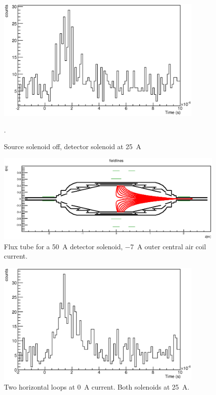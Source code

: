 \begin{figure}
\centering
	\includegraphics[width = 0.9\textwidth]{graphics/analysis/monSpec/AA.eps}
	\caption[\SI{25}{\ampere} asymmetric]{Source solenoid off, detector solenoid at \SI{25}{\ampere}}.
	\label{fig:AA}
\end{figure}
\clearpage



\begin{figure}
\centering
	\centerline{\includegraphics[width = 1.3\linewidth]{graphics/analysis/monSpec/fieldSimulation/AC.eps} }
	
	\caption[\SI{50}{\ampere} loops]{Flux tube for a \SI{50}{\ampere} detector solenoid, \SI{-7}{\ampere} outer central air coil current.}
	\label{fig:ACf}
\end{figure}

\begin{figure}
\centering
	\includegraphics[width = 0.9\textwidth]{graphics/analysis/monSpec/AC.eps}
	\caption[\SI{50}{\ampere} loops]{Two horizontal loops at \SI{0}{\ampere} current. Both solenoids at \SI{25}{\ampere}.}
	\label{fig:AC}
\end{figure}
\clearpage






